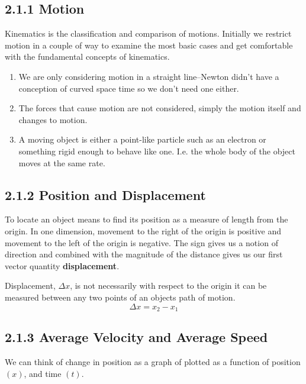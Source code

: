 \documentclass{article}
\begin{document}
\subsection*{2.1.1 Motion}
Kinematics is the classification and comparison of motions. Initially we restrict motion in a couple of way to examine the most basic cases and get comfortable with the fundamental concepts of kinematics.
\begin{enumerate}
	\item We are only considering motion in a straight line--Newton didn't have a conception of curved space time so we don't need one either.
	\item The forces that cause motion are not considered, simply the motion itself and changes to motion.
	\item A moving object is either a point-like particle such as an electron or something rigid enough to behave like one. I.e. the whole body of the object moves at the same rate.
\end{enumerate}

\subsection*{2.1.2 Position and Displacement}
To locate an object means to find its position as a measure of length from the origin. In one dimension, movement to the right of the origin is positive and movement to the left of the origin is negative. The sign gives us a notion of direction and combined with the magnitude of the distance gives us our first vector quantity \textbf{displacement}.

Displacement, $\Delta x$, is not necessarily with respect to the origin it can be measured between any two points of an objects path of motion.
\[
	\Delta x = x_2-x_1
\]

\subsection*{2.1.3 Average Velocity and Average Speed}
We can think of change in position as a graph of plotted as a function of position $(x)$, and time $(t)$.
\end{document}
